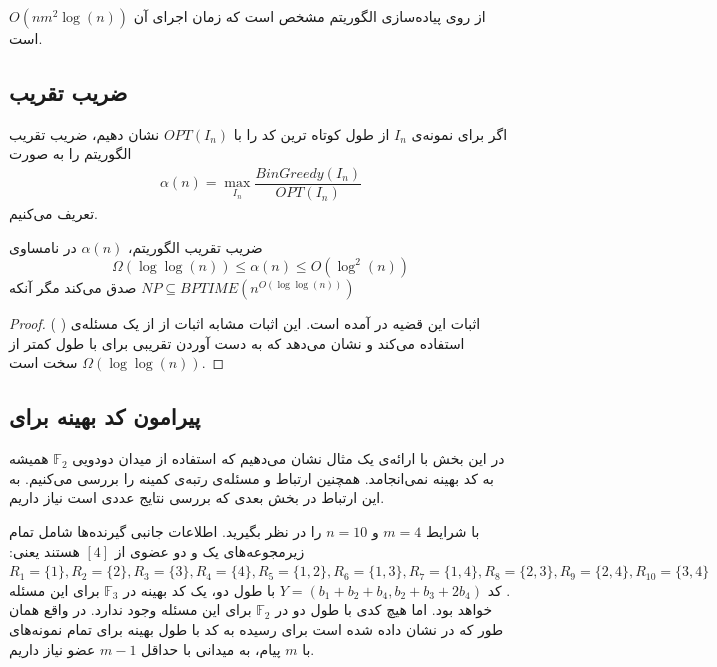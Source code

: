 از روی پیاده‌سازی الگوریتم مشخص است که زمان اجرای آن
$O(nm^2 \log(n))$
است.
\subsection{
ضریب تقریب
}
\begin{definition}
اگر برای نمونه‌ی
$I_n$
از 
\picod
طول کوتاه ترین کد را با
$OPT(I_n)$
نشان دهیم، ضریب تقریب الگوریتم را به صورت
 \begin{align}
 	\alpha(n) = \max\limits_{I_n} \dfrac{BinGreedy(I_n)}{OPT(I_n)}
 \end{align}
تعریف می‌کنیم.
\end{definition}


\begin{theorem}
	\label{theorem:pliable2016:theorem2}
	ضریب تقریب الگوریتم،
	$\alpha(n)$
	در نامساوی
	$$\Omega(\log \log (n)) \leq \alpha(n) \leq O(\log^2(n))$$
	صدق می‌کند مگر آنکه
	$NP \subseteq BPTIME(n^{O(\log \log (n))})$
\end{theorem}
\begin{proof}
	اثبات این قضیه در
	\cite{song2016deterministic}
	آمده است. این اثبات مشابه اثبات
	\cite{ELKIN20048}
	از 
	از یک مسئله‌ی 
	\nphard
	(
	) استفاده می‌کند و نشان می‌دهد که به دست آوردن تقریبی برای
	\picod
	با طول کمتر از
	$\Omega(\log \log (n))$
	سخت است.
\end{proof}

\subsection{
پیرامون کد بهینه برای
\picod
}
در این بخش با ارائه‌ی یک مثال نشان می‌دهیم که استفاده از میدان دودویی
$\mathbb{F}_2$
همیشه به کد بهینه نمی‌انجامد. همچنین ارتباط
\picod
و مسئله‌ی رتبه‌ی کمینه را بررسی می‌کنیم. به این ارتباط در بخش بعدی که بررسی نتایج عددی است نیاز داریم.
\begin{example}
	\picod
	با شرایط
	$m = 4$
	و
	$n = 10$
	را در نظر بگیرید. اطلاعات جانبی گیرنده‌ها شامل تمام زیرمجوعه‌های یک و دو عضوی از
	$[4]$
	هستند یعنی:
	$R_1 = \{1\}, R_2 = \{2\}, R_3 = \{3\}, R_4 = \{4\}, R_5 = \{1, 2\}, R_6 = \{1, 3\}, R_7 = \{1, 4\}, R_8 = \{2, 3\}, R_9 = \{2, 4\}, R_{10} = \{3, 4\}$.
	کد
	$Y = (b_1 + b_2 + b_4, b_2+b_3+2b_4)$
	با طول دو، یک کد بهینه در
	$\mathbb{F}_3$
	برای این مسئله خواهد بود. اما هیچ کدی با طول دو در
	$\mathbb{F}_2$
	برای این مسئله وجود ندارد. در واقع همان طور که در
	\cite{song2016deterministic}
	نشان داده شده است برای رسیده به کد با طول بهینه برای تمام نمونه‌های با
	$m$
	پیام، به میدانی با حداقل
	$m - 1$
	عضو نیاز داریم.
\end{example}

